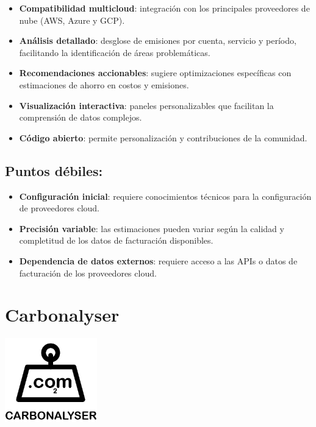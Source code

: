 \documentclass[12pt,a4paper]{report}
\begin{document}
\begin{itemize}
  \item \textbf{Compatibilidad multicloud}: integración con los principales proveedores de nube (AWS, Azure y GCP).
  \item \textbf{Análisis detallado}: desglose de emisiones por cuenta, servicio y período, facilitando la identificación de áreas problemáticas.
  \item \textbf{Recomendaciones accionables}: sugiere optimizaciones específicas con estimaciones de ahorro en costos y emisiones.
  \item \textbf{Visualización interactiva}: paneles personalizables que facilitan la comprensión de datos complejos.
  \item \textbf{Código abierto}: permite personalización y contribuciones de la comunidad.
\end{itemize}

\subsection*{Puntos débiles:}

\begin{itemize}
  \item \textbf{Configuración inicial}: requiere conocimientos técnicos para la configuración de proveedores cloud.
  \item \textbf{Precisión variable}: las estimaciones pueden variar según la calidad y completitud de los datos de facturación disponibles.
  \item \textbf{Dependencia de datos externos}: requiere acceso a las APIs o datos de facturación de los proveedores cloud.
\end{itemize}

\section*{Carbonalyser}

\begin{center}
\includegraphics[width=0.3\textwidth]{imagenes/Carbonalyser_Logo.png}
\end{center}
\end{document}
